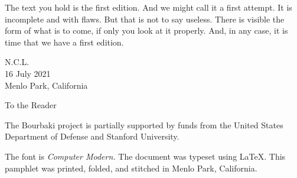 The text you hold is the first edition.
And we might call it a first attempt.
It is incomplete and with flaws.
But that is not to say useless.
There is visible the form of what is to come, if only you look at it properly.
And, in any case, it is time that we have a first edition.

\begin{flushright}
N.C.L. \\
16 July 2021 \\
Menlo Park, California \\
\end{flushright}

\clearpage

\begin{center}
\vspace*{-1.5cm}
  \sf To the Reader
\end{center}



\clearpage

\tableofcontents

\clearpage




\clearpage


The Bourbaki project is partially supported by funds from the United States Department of Defense and Stanford University.

\clearpage

\noindent\noindent The font is \textit{Computer Modern.}
The document was typeset using \LaTeX.
This pamphlet was printed, folded, and stitched in Menlo Park, California.


